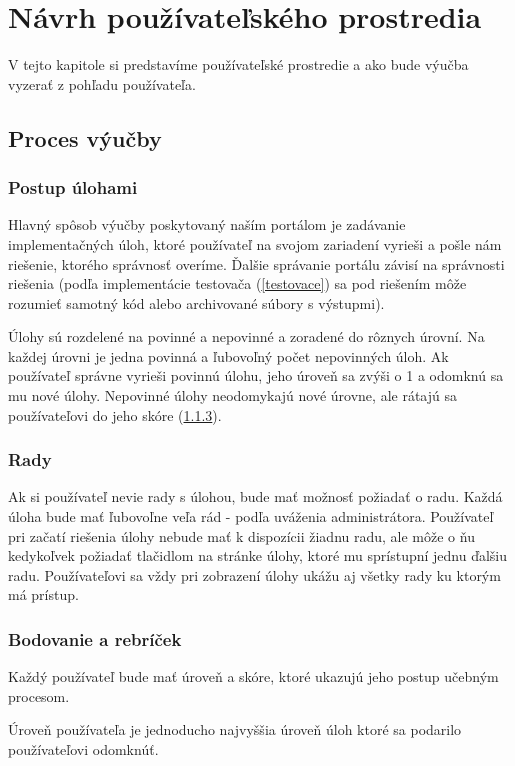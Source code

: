 \chapter{Návrh používateľského prostredia}

\label{kap:front}

V tejto kapitole si predstavíme používateľské prostredie a ako bude výučba vyzerať
z pohľadu používateľa.

\section{Proces výučby}
\subsection{Postup úlohami}
Hlavný spôsob výučby poskytovaný naším portálom je zadávanie implementačných úloh,
ktoré používateľ na svojom zariadení vyrieši a pošle nám riešenie, ktorého správnosť
overíme. Ďalšie správanie portálu závisí na správnosti riešenia
(podľa implementácie testovača (\ref{testovace}) sa pod riešením môže rozumieť
samotný kód alebo archivované súbory s výstupmi).

Úlohy sú rozdelené na povinné a nepovinné a zoradené do rôznych úrovní.
Na každej úrovni je jedna povinná a ľubovoľný počet nepovinných úloh.
Ak používateľ správne vyrieši povinnú úlohu, jeho úroveň sa zvýši o 1 a
odomknú sa mu nové úlohy. Nepovinné úlohy neodomykajú nové úrovne, ale rátajú
sa používateľovi do jeho skóre (\ref{score}).

\subsection{Rady}
Ak si používateľ nevie rady s úlohou, bude mať možnosť požiadať o radu. Každá úloha
bude mať ľubovoľne veľa rád - podľa uváženia administrátora. Používateľ pri začatí riešenia
úlohy nebude mať k dispozícii žiadnu radu, ale môže o ňu kedykoľvek požiadať tlačidlom na
stránke úlohy, ktoré mu sprístupní jednu ďalšiu radu.
Používateľovi sa vždy pri zobrazení úlohy ukážu aj všetky rady ku ktorým má prístup.

\newpage
\subsection{Bodovanie a rebríček}
\label{score}
Každý používateľ bude mať úroveň a skóre, ktoré ukazujú jeho postup učebným procesom.

Úroveň používateľa je jednoducho najvyššia úroveň úloh ktoré sa podarilo používateľovi odomknúť.

